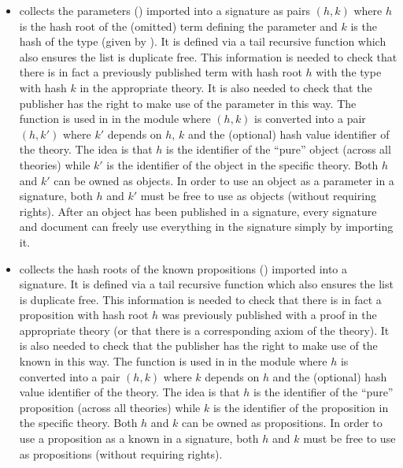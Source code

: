 \begin{itemize}
\item {} collects the
parameters ({}) imported into a signature
as pairs $(h,k)$ where $h$ is the hash root of the (omitted) term defining the parameter
and $k$ is the hash of the type (given by {}).
It is defined via a tail recursive function {}
which also ensures the list is duplicate free.
This information is needed to check that there is in fact a previously published term
with hash root $h$ with the type with hash $k$
in the appropriate theory. It is also needed to check that the publisher has the right
to make use of the parameter in this way.
The function is used in {}
in the {} module
where $(h,k)$ is converted into a pair $(h,k')$ where $k'$
depends on $h$, $k$ and the (optional) hash value identifier of the theory.
The idea is that $h$ is the identifier of the ``pure'' object (across all theories)
while $k'$ is the identifier of the object in the specific theory.
Both $h$ and $k'$ can be owned as objects.
In order to use an object as a parameter in a signature, both $h$ and $k'$ must be free to use
as objects (without requiring rights).
After an object has been published in a signature, every
signature and document can freely use everything in
the signature simply by importing it.
\item {} collects the
hash roots of the known propositions ({}) imported into a signature.
It is defined via a tail recursive function {}
which also ensures the list is duplicate free.
This information is needed to check that there is in fact a proposition 
with hash root $h$
was previously published with a proof
in the appropriate theory (or that there is a corresponding axiom of the theory).
It is also needed to check that the publisher has the right
to make use of the known in this way.
The function is used in {}
in the {} module
where $h$ is converted into a pair $(h,k)$ where $k$
depends on $h$ and the (optional) hash value identifier of the theory.
The idea is that $h$ is the identifier of the ``pure'' proposition (across all theories)
while $k$ is the identifier of the proposition in the specific theory.
Both $h$ and $k$ can be owned as propositions.
In order to use a proposition as a known in a signature, both $h$ and $k$ must be free to use
as propositions (without requiring rights).

\end{itemize}
